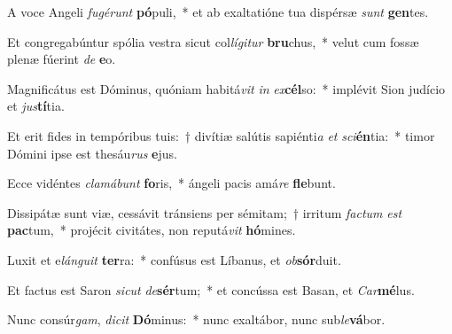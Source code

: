 \item A voce Angeli \textit{fu}\textit{gé}\textit{runt} \textbf{pó}puli,~* et ab exaltatióne tua dispérsæ \textit{sunt} \textbf{gen}tes.
\item Et congregabúntur spólia vestra sicut col\textit{lí}\textit{gi}\textit{tur} \textbf{bru}chus,~* velut cum fossæ plenæ fúerint \textit{de} \textbf{e}o.
\item Magnificátus est Dóminus, quóniam habitá\textit{vit} \textit{in} \textit{ex}\textbf{cél}so:~* implévit Sion judício et \textit{jus}\textbf{tí}tia.
\item Et erit fides in tempóribus tuis:~† divítiæ salútis sapiénti\textit{a} \textit{et} \textit{sci}\textbf{én}tia:~* timor Dómini ipse est thesáu\textit{rus} \textbf{e}jus.
\item Ecce vidéntes \textit{cla}\textit{má}\textit{bunt} \textbf{fo}ris,~* ángeli pacis amá\textit{re} \textbf{fle}bunt.
\item Dissipátæ sunt viæ, cessávit tránsiens per sémitam;~† irritum \textit{fac}\textit{tum} \textit{est} \textbf{pac}tum,~* projécit civitátes, non reputá\textit{vit} \textbf{hó}mines.
\item Luxit et e\textit{lán}\textit{gu}\textit{it} \textbf{ter}ra:~* confúsus est Líbanus, et \textit{ob}\textbf{sór}duit.
\item Et factus est Saron \textit{sic}\textit{ut} \textit{de}\textbf{sér}tum;~* et concússa est Basan, et \textit{Car}\textbf{mé}lus.
\item Nunc consúr\textit{gam}, \textit{di}\textit{cit} \textbf{Dó}minus:~* nunc exaltábor, nunc sub\textit{le}\textbf{vá}bor.

